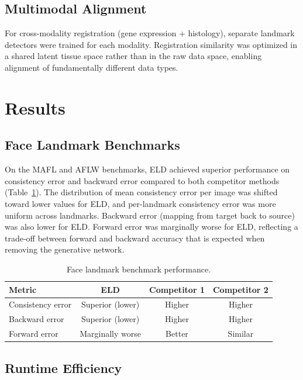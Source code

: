 \documentclass[11pt]{article}
\begin{document}
\subsection{Multimodal Alignment}

For cross-modality registration (gene expression + histology), separate landmark detectors were trained for each modality. Registration similarity was optimized in a shared latent tissue space rather than in the raw data space, enabling alignment of fundamentally different data types.

\section{Results}

\subsection{Face Landmark Benchmarks}

On the MAFL and AFLW benchmarks, ELD achieved superior performance on consistency error and backward error compared to both competitor methods (Table~\ref{tab:benchmark}). The distribution of mean consistency error per image was shifted toward lower values for ELD, and per-landmark consistency error was more uniform across landmarks. Backward error (mapping from target back to source) was also lower for ELD. Forward error was marginally worse for ELD, reflecting a trade-off between forward and backward accuracy that is expected when removing the generative network.

\begin{table}[h]
\centering
\caption{Face landmark benchmark performance.}
\label{tab:benchmark}
\begin{tabular}{lccc}
\toprule
Metric & ELD & Competitor 1 & Competitor 2 \\
\midrule
Consistency error & Superior (lower) & Higher & Higher \\
Backward error & Superior (lower) & Higher & Higher \\
Forward error & Marginally worse & Better & Similar \\
\bottomrule
\end{tabular}
\end{table}

\subsection{Runtime Efficiency}
\end{document}
